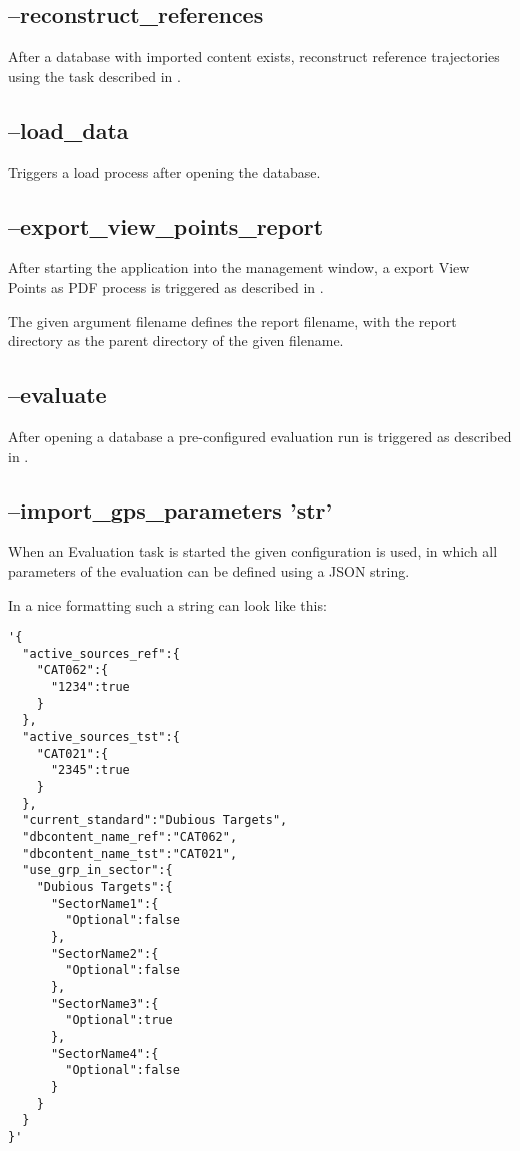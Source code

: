 \subsection{--reconstruct\_references}

After a database with imported content exists, reconstruct reference trajectories using the task described in .

\subsection{--load\_data}

Triggers a load process after opening the database.

\subsection{--export\_view\_points\_report}

After starting the application into the management window, a export View Points as PDF process is triggered as described in
.

The given argument filename defines the report filename, with the report directory as the parent directory of the given filename.

\subsection{--evaluate}

After opening a database a pre-configured evaluation run is triggered as described in .

\subsection{--import\_gps\_parameters 'str'}

When an Evaluation task is started the given configuration is used, in which all parameters of the evaluation can be defined using a JSON string.

In a nice formatting such a string can look like this:
\begin{lstlisting}[basicstyle=\small\ttfamily]
'{
  "active_sources_ref":{
    "CAT062":{
      "1234":true
    }
  },
  "active_sources_tst":{
    "CAT021":{
      "2345":true
    }
  },
  "current_standard":"Dubious Targets",
  "dbcontent_name_ref":"CAT062",
  "dbcontent_name_tst":"CAT021",
  "use_grp_in_sector":{
    "Dubious Targets":{
      "SectorName1":{
        "Optional":false
      },
      "SectorName2":{
        "Optional":false
      },
      "SectorName3":{
        "Optional":true
      },
      "SectorName4":{
        "Optional":false
      }
    }
  }
}'
\end{lstlisting}
\ \\

